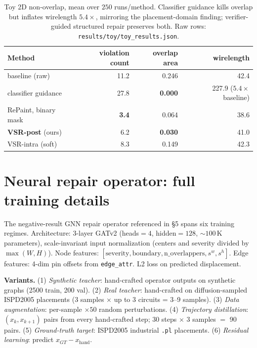 \documentclass{article}
\begin{document}
\begin{table}[h]
\centering
\small
\begin{tabular}{lrrr}
\toprule
Method & violation count & overlap area & wirelength \\
\midrule
baseline (raw)         & 11.2  & 0.246  & 42.4 \\
classifier guidance    & 27.8  & \textbf{0.000} & 227.9 ($5.4\times$ baseline) \\
RePaint, binary mask   & \textbf{3.4} & 0.064  & 38.6 \\
\textbf{VSR-post} (ours) & 6.2 & \textbf{0.030} & 41.0 \\
VSR-intra (soft)       & 8.3   & 0.149  & 42.3 \\
\bottomrule
\end{tabular}
\caption{Toy 2D non-overlap, mean over $250$ runs/method.  Classifier
guidance kills overlap but inflates wirelength $5.4\times$, mirroring the
placement-domain finding; verifier-guided structured repair preserves both.
Raw rows: \texttt{results/toy/toy\_results.json}.}
\label{tab:supp-toy}
\end{table}

\section{Neural repair operator: full training details}
\label{sec:supp-neural}

The negative-result GNN repair operator referenced in \S5 spans six training
regimes.  Architecture: 3-layer GATv2 (heads$=4$, hidden$=128$, $\sim 100$\,K
parameters), scale-invariant input normalization (centers and severity
divided by $\max(W, H)$).  Node features:
$[\mathrm{severity}, \mathrm{boundary}, \mathrm{n\_overlappers}, s^w, s^h]$.
Edge features: 4-dim pin offsets from \texttt{edge\_attr}.  L2 loss on
predicted displacement.

\textbf{Variants.}
(1) \emph{Synthetic teacher}: hand-crafted operator outputs on synthetic
graphs (2500 train, 200 val).
(2) \emph{Real teacher}: hand-crafted on diffusion-sampled ISPD2005 placements
(3 samples $\times$ up to 3 circuits = 3--9 samples).
(3) \emph{Data augmentation}: per-sample $\times 50$ random perturbations.
(4) \emph{Trajectory distillation}: $(x_k, x_{k+1})$ pairs from every
hand-crafted step; 30 steps $\times$ 3 samples $=$ 90 pairs.
(5) \emph{Ground-truth target}: ISPD2005 industrial \texttt{.pl} placements.
(6) \emph{Residual learning}: predict $x_{GT} - x_{\text{hand}}$.
\end{document}
